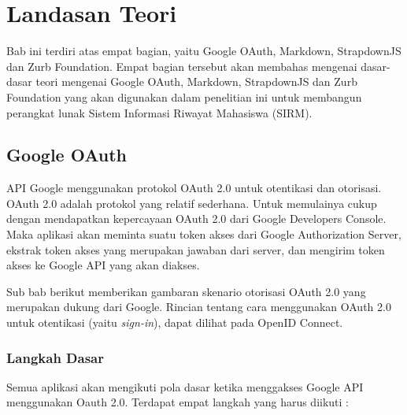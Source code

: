 \chapter{Landasan Teori}
\label{chap:landasanteori}

Bab ini terdiri atas empat bagian, yaitu Google OAuth, Markdown, StrapdownJS dan
Zurb Foundation. Empat bagian tersebut akan membahas mengenai dasar-dasar teori
mengenai Google OAuth, Markdown, StrapdownJS dan Zurb Foundation yang akan
digunakan dalam penelitian ini untuk membangun perangkat lunak Sistem Informasi
Riwayat Mahasiswa (SIRM).

\section{Google OAuth \cite{Oauth:2013}}
\label{sec:googleauthentication}

API Google menggunakan protokol OAuth 2.0 untuk otentikasi dan otorisasi. OAuth
2.0 adalah protokol yang relatif sederhana. Untuk memulainya cukup dengan
mendapatkan kepercayaan OAuth 2.0 dari Google Developers
Console\footnotemark[1]. Maka aplikasi akan meminta suatu token akses dari
Google Authorization Server, ekstrak token akses yang merupakan jawaban
dari server, dan mengirim token akses ke Google API yang akan diakses.


Sub bab berikut memberikan gambaran skenario otorisasi OAuth 2.0 yang merupakan
dukung dari Google. Rincian tentang cara menggunakan OAuth 2.0 untuk otentikasi
(yaitu {\it sign-in}), dapat dilihat pada OpenID Connect\footnotemark[2].

\subsection{Langkah Dasar}
Semua aplikasi akan mengikuti pola dasar ketika menggakses Google API
menggunakan Oauth 2.0. Terdapat empat langkah yang harus diikuti :

